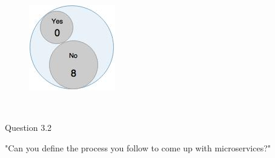 \begin{figure}[H]
\begin{center}
\includegraphics[scale=0.5]{figures/question3_1}
\label{fig:hybris_architecture/interview/question3-1}
\end{center}
\end{figure}
\\
\begin{shaded} Question 3.2 \end{shaded} \label{question:hybris_architecture/interview/question_3.2}
"Can you define the process you follow to come up with microservices?"
